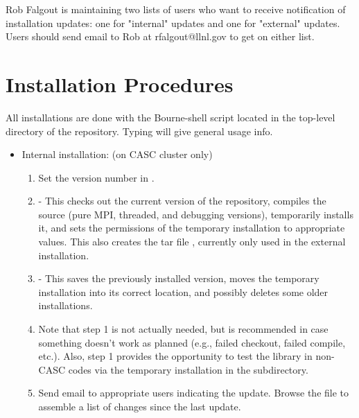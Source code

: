 Rob Falgout is maintaining two lists of users who want to receive
notification of installation updates: one for "internal" updates and
one for "external" updates.  Users should send email to Rob at
rfalgout@llnl.gov to get on either list.

\section{Installation Procedures}
\label{Installation Procedures}

All installations are done with the  Bourne-shell script
located in the top-level directory of the \hypre{} repository.  Typing
 will give general usage info.
\begin{itemize}

\item Internal installation: (on CASC cluster only)
\begin{enumerate}

   \item Set the version number in .
  
   \item {} - This checks out the current version
   of the repository, compiles the source (pure MPI, threaded, and
   debugging versions), temporarily installs it, and sets the
   permissions of the temporary installation to appropriate values.
   This also creates the tar file , currently only
   used in the external installation.
  
   \item {} - This saves the previously
   installed version, moves the temporary installation into its
   correct location, and possibly deletes some older installations.
  
   \item Note that step 1 is not actually needed, but is recommended
   in case something doesn't work as planned (e.g., failed checkout,
   failed compile, etc.).  Also, step 1 provides the opportunity to
   test the library in non-CASC codes via the temporary installation
   in the  subdirectory.
  
   \item Send email to appropriate users indicating the update.
   Browse the  file to assemble a list
   of changes since the last update.


\end{enumerate}
\end{itemize}
